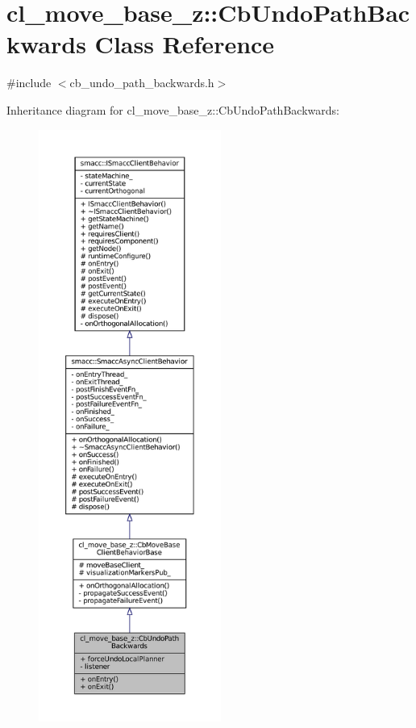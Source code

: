\hypertarget{classcl__move__base__z_1_1CbUndoPathBackwards}{}\section{cl\+\_\+move\+\_\+base\+\_\+z\+:\+:Cb\+Undo\+Path\+Backwards Class Reference}
\label{classcl__move__base__z_1_1CbUndoPathBackwards}


{\ttfamily \#include $<$cb\+\_\+undo\+\_\+path\+\_\+backwards.\+h$>$}



Inheritance diagram for cl\+\_\+move\+\_\+base\+\_\+z\+:\+:Cb\+Undo\+Path\+Backwards\+:
\nopagebreak
\begin{figure}[H]
\begin{center}
\leavevmode
\includegraphics[height=550pt]{classcl__move__base__z_1_1CbUndoPathBackwards__inherit__graph}
\end{center}
\end{figure}


